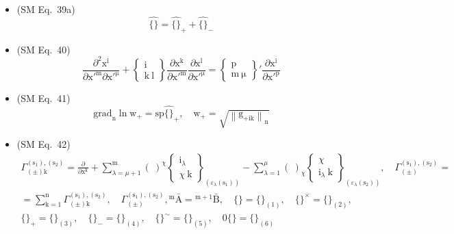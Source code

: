 \documentclass[12pt]{article}
\begin{document}
\begin{itemize}[label={},leftmargin=0pt]
    \item (SM Eq.\ 39a) 
    \[
    \widehat{\{\}} = \widehat{\{\}}_+ + \widehat{\{\}}_-
    \]

    \item (SM Eq.\ 40) 
    \[
    \frac{\partial^2 \mathrm{x^i}}{\partial \mathrm{x'^m} \partial \mathrm{x'^\mu}} + \left\{ \begin{smallmatrix} \mathrm{i} \\ \mathrm{k\ l} \end{smallmatrix} \right\} \frac{\partial \mathrm{x^k}}{\partial \mathrm{x'^m}} \frac{\partial \mathrm{x^l}}{\partial \mathrm{x'^\mu}} = \left\{ \begin{smallmatrix} \mathrm{p} \\ \mathrm{m\ \mu} \end{smallmatrix} \right\}' \frac{\partial \mathrm{x^i}}{\partial \mathrm{x'^p}}
    \]

    \item (SM Eq.\ 41) 
    \[
    \mathrm{grad}_\mathrm{n} \ln \mathrm{w}_+ = \mathrm{sp} \widehat{\{\}}_+, \quad \mathrm{w}_+ = \sqrt{\left\| \mathrm{g}_{+\mathrm{ik}} \right\|_\mathrm{n}}
    \]

    \item (SM Eq.\ 42) 
    \[
    \begin{gathered}
    \Gamma^{(\mathrm{s}_1), (\mathrm{s}_2)}_{(\pm)\mathrm{k}} = \frac{\partial}{\partial \mathrm{x^k}} + \sum_{\lambda=\mu+1}^{\mathrm{m}} (\ )^\chi \left\{ \begin{smallmatrix} \mathrm{i}_\lambda \\ \chi\ \mathrm{k} \end{smallmatrix} \right\}_{(\varepsilon_\lambda(\mathrm{s}_1))} - \sum_{\lambda=1}^{\mu} (\ )_\chi \left\{ \begin{smallmatrix} \chi \\ \mathrm{i}_\lambda\ \mathrm{k} \end{smallmatrix} \right\}_{(\varepsilon_\lambda(\mathrm{s}_2))}, \quad \Gamma^{(\mathrm{s}_1), (\mathrm{s}_2)}_{(\pm)} = \\
    = \sum_{\mathrm{k}=1}^\mathrm{n} \Gamma^{(\mathrm{s}_1), (\mathrm{s}_2)}_{(\pm)\mathrm{k}}, \quad \Gamma^{(\mathrm{s}_1), (\mathrm{s}_2)}_{(\pm)}, {}^\mathrm{m}\bar{\mathrm{A}} = {}^{\mathrm{m}+1}\bar{\mathrm{B}}, \quad \{ \} = \{ \}_{(1)}, \quad \{ \}^\times = \{ \}_{(2)}, \\
    \{ \}_+ = \{ \}_{(3)}, \quad \{ \}_- = \{ \}_{(4)}, \quad \{ \}^\sim = \{ \}_{(5)}, \quad 0\{ \} = \{ \}_{(6)}
    \end{gathered}
    \]


\end{itemize}
\end{document}
